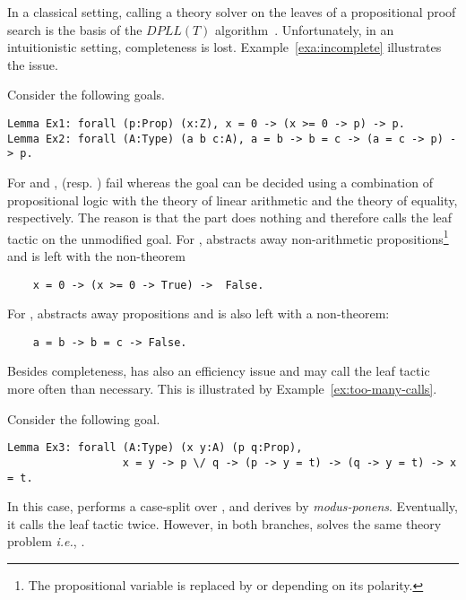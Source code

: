 \documentclass[utf8,a4paper,UKenglish,cleveref, autoref, thm-restate]{lipics-v2019}
\begin{document}
In a classical setting, calling a theory solver on the leaves of a
propositional proof search is the basis of the $\mathit{DPLL(T)}$
algorithm~\cite{GanzingerHNOT04}.  Unfortunately, in an intuitionistic
setting, completeness is lost. Example~\ref{exa:incomplete}
illustrates the issue.
\begin{example}
  \label{exa:incomplete}
  Consider the following goals.
  \begin{verbatim}
Lemma Ex1: forall (p:Prop) (x:Z), x = 0 -> (x >= 0 -> p) -> p.
Lemma Ex2: forall (A:Type) (a b c:A), a = b -> b = c -> (a = c -> p) -> p.
\end{verbatim}
  For  and ,  (resp. ) fail whereas
  the goal can be decided using a combination of
  propositional logic with the theory of linear arithmetic and
  the theory of equality, respectively.
  The reason is that the  part does nothing and
  therefore calls the leaf tactic on the unmodified goal.  For
  ,  abstracts away non-arithmetic
  propositions\footnote{The propositional variable  is replaced by
     or  depending on its polarity.} and is
  left with the non-theorem
  \begin{verbatim}
    x = 0 -> (x >= 0 -> True) ->  False.
  \end{verbatim}
  For ,  abstracts away
  propositions and is also left with a non-theorem:
  \begin{verbatim}
    a = b -> b = c -> False.
  \end{verbatim}
\end{example}
Besides completeness,  has also an efficiency issue and may call the leaf tactic 
more often than necessary. %
This is illustrated by Example~\ref{ex:too-many-calls}.
\begin{example}
  \label{ex:too-many-calls}
  Consider the following goal.
  \begin{verbatim}
Lemma Ex3: forall (A:Type) (x y:A) (p q:Prop),
                  x = y -> p \/ q -> (p -> y = t) -> (q -> y = t) -> x = t.
  \end{verbatim}
  In this case,  performs a case-split
  over , and derives  by
  \emph{modus-ponens}. Eventually, it calls the leaf tactic
   twice.  However, in both branches,
   solves the same theory problem \emph{i.e.},
  .
\end{example}
\end{document}
